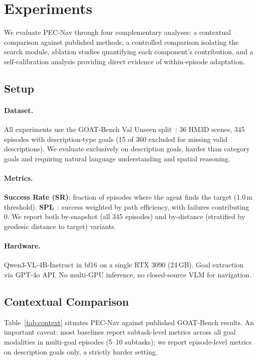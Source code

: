 \documentclass[10pt,twocolumn,letterpaper]{article}
\begin{document}
\section{Experiments}

We evaluate PEC-Nav through four complementary analyses: a contextual comparison against published methods, a controlled comparison isolating the search module, ablation studies quantifying each component's contribution, and a self-calibration analysis providing direct evidence of within-episode adaptation.

\subsection{Setup}

\paragraph{Dataset.} All experiments use the GOAT-Bench Val Unseen split~\cite{khanna2024goatbench}: 36 HM3D scenes, 345 episodes with description-type goals (15 of 360 excluded for missing valid descriptions). We evaluate exclusively on description goals, harder than category goals and requiring natural language understanding and spatial reasoning.

\paragraph{Metrics.} \textbf{Success Rate (SR)}: fraction of episodes where the agent finds the target (1.0\,m threshold). \textbf{SPL}~\cite{anderson2018spl}: success weighted by path efficiency, with failures contributing 0. We report both by-snapshot (all 345 episodes) and by-distance (stratified by geodesic distance to target) variants.

\paragraph{Hardware.} Qwen3-VL-4B-Instruct in bf16 on a single RTX 3090 (24\,GB). Goal extraction via GPT-4o API. No multi-GPU inference, no closed-source VLM for navigation.

\subsection{Contextual Comparison}

Table~\ref{tab:context} situates PEC-Nav against published GOAT-Bench results. An important caveat: most baselines report subtask-level metrics across all goal modalities in multi-goal episodes (5--10 subtasks); we report episode-level metrics on description goals only, a strictly harder setting.
\end{document}
